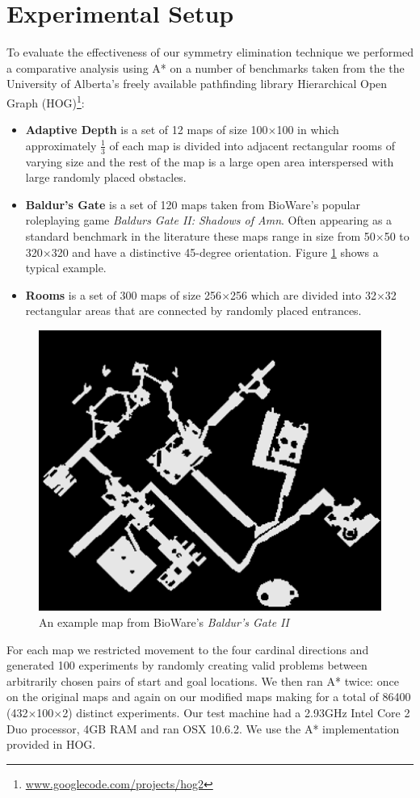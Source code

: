 \section{Experimental Setup}
To evaluate the effectiveness of our symmetry elimination technique we performed
a comparative analysis using A* on a number of benchmarks taken from the
the University of Alberta's freely available pathfinding library 
Hierarchical Open Graph (HOG)\footnote{\url{www.googlecode.com/projects/hog2}}:
\begin{itemize}
\item{\textbf{Adaptive Depth} is a set of 12 maps of size 100$\times$100 in which approximately
$\frac{1}{3}$ of each map is divided into adjacent rectangular rooms of
varying size and the rest of the map is a large open area interspersed with 
large randomly placed obstacles.}
\item{\textbf{Baldur's Gate} is a set of 120 maps taken from BioWare's popular
roleplaying game \emph{Baldurs Gate II: Shadows of Amn}. 
Often appearing as a standard benchmark in the literature 
\cite{botea04,bjornsson05,bjornsson06,sturtevant05,harabor08} these maps range in 
size from 50$\times$50 to 320$\times$320 and have a distinctive 45-degree orientation.
Figure \ref{fig-bgmap} shows a typical example.}
\item{\textbf{Rooms} is a set of 300 maps of size 256$\times$256 which are divided into 32$\times$32
rectangular areas that are connected by randomly placed entrances.}
\end{itemize}

 \begin{figure}[t]
        \begin{center}
                        \includegraphics[width=0.6\columnwidth, trim = 10mm 10mm 10mm 0mm]{diagrams/bgmap.png}
        \end{center}
        \caption{An example map from BioWare's \emph{Baldur's Gate II}}
        \label{fig-bgmap}
 \end{figure}
\par
For each map we restricted movement to the four cardinal directions and generated 100 experiments by 
randomly creating valid problems between arbitrarily chosen pairs of start and goal locations.
We then ran A* twice: once on the original maps and again on our modified maps making for
a total of 86400 (432$\times$100$\times$2) distinct experiments.
Our test machine had a 2.93GHz Intel Core 2 Duo processor, 4GB RAM and
ran OSX 10.6.2.
We use the A* implementation provided in HOG.
